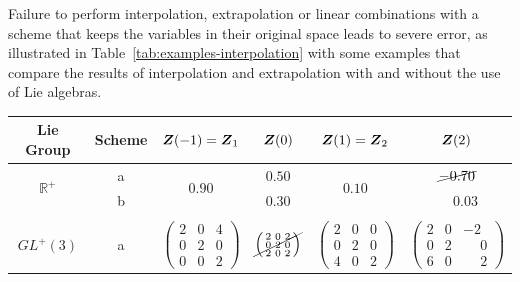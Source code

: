 \documentclass[12pt]{article}
\newcommand{\mbb}[1]{\mathbb{#1}}
\begin{document}
Failure to perform interpolation, extrapolation or linear combinations with a
scheme that keeps the variables in their original space leads to severe error,
as illustrated in Table~\ref{tab:examples-interpolation} with some examples that
compare the results of interpolation and extrapolation with and without the use
of Lie algebras.

\begin{table}[htbp]
  \begin{center}
    \begin{tabular}{ c c c c c c}
      \toprule
      Lie Group
      &
      Scheme
      &
      ${\boldsymbol{Z}}(-1) = {\boldsymbol{Z}}_1$
      &
      ${\boldsymbol{Z}}(0)$
      &
      ${\boldsymbol{Z}}(1) = {\boldsymbol{Z}}_2$
      &
      ${\boldsymbol{Z}}(2)$
      \\
      \hline
      \multirow{2}{*}{$\mbb{R}^+$}
      &
      a
      &
      \multirow{2}{*}{$0.90$}
      &
      $0.50$
      &
      \multirow{2}{*}{$0.10$}
      &
      $\cancel{-0.70}$
      \\
      
      &
      b
      &
      
      &
      $0.30$
      &
      
      &
      $\phantom{-}0.03$
      \\
      \\
      \multirow{4}{*}{$GL^+(3)$}
      &
      \multirow{2}{*}{a}
      &
      \multirow{4}{*}{
        $\left(
          \begin{smallmatrix}
            2 & 0 & 4\\
            0 & 2 & 0\\
            0 & 0 & 2
          \end{smallmatrix}
        \right)$}
      &
      \multirow{2}{*}{
        $\cancel{\left(
          \begin{smallmatrix}
            2 & 0 & 2\\
            0 & 2 & 0\\
            2 & 0 & 2
          \end{smallmatrix}
        \right)}$}
      &
      \multirow{4}{*}{
        $\left(
          \begin{smallmatrix}
            2 & 0 & 0\\
            0 & 2 & 0\\
            4 & 0 & 2
          \end{smallmatrix}
        \right)$}
      &
      \multirow{2}{*}{
        $\left(
          \begin{smallmatrix}
            2 & 0 & -2\\
            0 & 2 & \phantom{-}0\\
            6 & 0 & \phantom{-}2
          \end{smallmatrix}
        \right)$}
      \\
      \\


\end{tabular}
\end{center}
\end{table}
\end{document}

